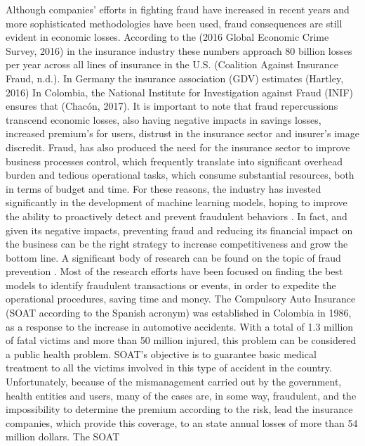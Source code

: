\documentclass[parskip=full]{scrartcl}
\begin{document}
Although companies’ efforts in fighting fraud have increased in recent years 
and more sophisticated methodologies have been used, fraud consequences are 
still evident in economic losses. According to the (2016 Global Economic Crime 
Survey, 2016) in the insurance industry these numbers approach 80 billion 
losses per year across all lines of insurance in the U.S. (Coalition Against 
Insurance Fraud, n.d.). In Germany the insurance association (GDV) estimates 
(Hartley, 2016) In Colombia, the National Institute for Investigation against 
Fraud (INIF) ensures that (Chacón, 2017).  It is important to note that fraud 
repercussions transcend economic losses, also having negative impacts in 
savings losses, increased premium’s for users, distrust in the insurance sector 
and insurer’s image discredit. Fraud, has also produced the need for the 
insurance sector to improve business processes control, which frequently 
translate into significant overhead burden and tedious operational tasks, which 
consume substantial resources, both in terms of budget and time. 
For these reasons, the industry has invested significantly in the development 
of machine learning models, hoping to improve the ability to proactively detect 
and prevent fraudulent behaviors \cite{Decker1998}. In fact, and given its 
negative impacts, preventing fraud and reducing its financial impact on the 
business can be the right strategy to increase competitiveness and grow the 
bottom line. A significant body of research can be found on the topic of fraud 
prevention \cite{Phua2004} \cite{Wei2012} \cite{Banarescu2015} 
\cite{Hassan2015} \cite{Kim2016} \cite{Sahin2013}. Most of the research efforts 
have been focused on finding the best models to identify fraudulent 
transactions or events, in order to expedite the operational procedures, saving 
time and money.
The Compulsory Auto Insurance (SOAT according to the Spanish acronym) was 
established in Colombia in 1986, as a response to the increase in automotive 
accidents. With a total of 1.3 million of fatal victims and more than 50 
million injured, this problem can be considered a public health problem. SOAT's 
objective is to guarantee basic medical treatment to all the victims involved 
in this type of accident in the country. Unfortunately, because of the 
mismanagement carried out by the government, health entities and users, many of 
the cases are, in some way, fraudulent, and the impossibility to determine the 
premium according to the risk, lead the insurance companies, which provide this 
coverage, to an state annual losses of more than 54 million dollars. The SOAT 
\end{document}
